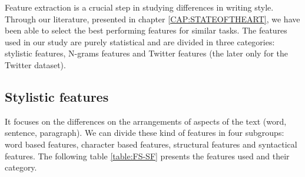 Feature extraction is a crucial step in studying differences in writing style. Through our literature, presented in chapter \ref{CAP:STATEOFTHEART}, we have been able to select the best performing features for similar tasks. The features used in our study are purely statistical and are divided in three categories: stylistic features, N-grams features and Twitter features (the later only for the Twitter dataset). 

\subsection{Stylistic features}
It focuses on the differences on the arrangements of aspects of the text (word, sentence, paragraph). We can divide these kind of features in four subgroups: word based features, character based features, structural features and syntactical features. The following table \ref{table:FS-SF} presents the features used and their category.


